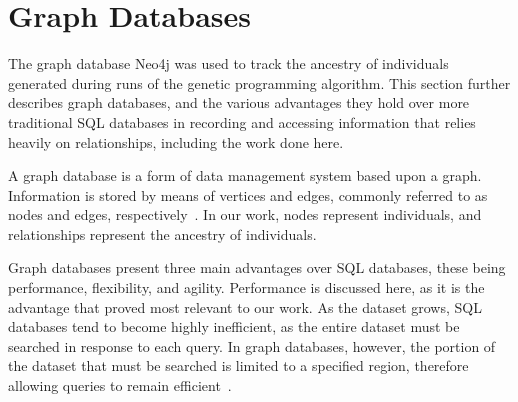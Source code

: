 \documentclass[12pt]{article}
\begin{document}





\section{Graph Databases}
\label{sec:Graph Databases}

The graph database Neo4j was used to track the ancestry of individuals generated during runs of the genetic programming algorithm. This section further describes graph databases, and the various advantages they hold over more traditional SQL databases in recording and accessing information that relies heavily on relationships, including the work done here.

A graph database is a form of data management system based upon a graph. Information is stored by means of vertices and edges, commonly referred to as nodes and edges, respectively~\cite{GraphDatabases:2013}. In our work, nodes represent individuals, and relationships represent the ancestry of individuals.

Graph databases present three main advantages over SQL databases, these being performance, flexibility, and agility. Performance is discussed here, as it is the advantage that proved most relevant to our work. As the dataset grows, SQL databases tend to become highly inefficient, as the entire dataset must be searched in response to each query. In graph databases, however, the portion of the dataset that must be searched is limited to a specified region, therefore allowing queries to remain efficient~\cite{GraphDatabases:2013}.





\end{document}
